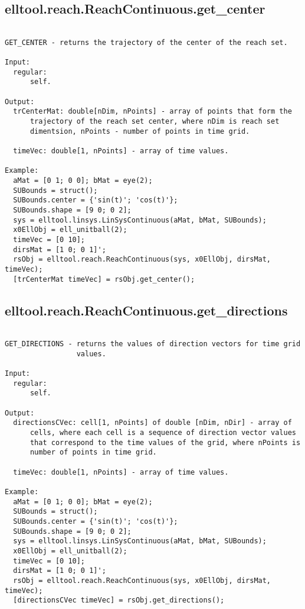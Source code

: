 \subsection{\texorpdfstring{elltool.reach.ReachContinuous.get\_center}{get\_center}}\label{method:elltool.reach.ReachContinuous.getcenter}
\begin{verbatim}

GET_CENTER - returns the trajectory of the center of the reach set.

Input:
  regular:
      self.

Output:
  trCenterMat: double[nDim, nPoints] - array of points that form the
      trajectory of the reach set center, where nDim is reach set
      dimentsion, nPoints - number of points in time grid.

  timeVec: double[1, nPoints] - array of time values.

Example:
  aMat = [0 1; 0 0]; bMat = eye(2);
  SUBounds = struct();
  SUBounds.center = {'sin(t)'; 'cos(t)'};
  SUBounds.shape = [9 0; 0 2];
  sys = elltool.linsys.LinSysContinuous(aMat, bMat, SUBounds);
  x0EllObj = ell_unitball(2);
  timeVec = [0 10];
  dirsMat = [1 0; 0 1]';
  rsObj = elltool.reach.ReachContinuous(sys, x0EllObj, dirsMat, timeVec);
  [trCenterMat timeVec] = rsObj.get_center();
\end{verbatim}
\subsection{\texorpdfstring{elltool.reach.ReachContinuous.get\_directions}{get\_directions}}\label{method:elltool.reach.ReachContinuous.getdirections}
\begin{verbatim}

GET_DIRECTIONS - returns the values of direction vectors for time grid
                 values.

Input:
  regular:
      self.

Output:
  directionsCVec: cell[1, nPoints] of double [nDim, nDir] - array of
      cells, where each cell is a sequence of direction vector values
      that correspond to the time values of the grid, where nPoints is
      number of points in time grid.

  timeVec: double[1, nPoints] - array of time values.

Example:
  aMat = [0 1; 0 0]; bMat = eye(2);
  SUBounds = struct();
  SUBounds.center = {'sin(t)'; 'cos(t)'};
  SUBounds.shape = [9 0; 0 2];
  sys = elltool.linsys.LinSysContinuous(aMat, bMat, SUBounds);
  x0EllObj = ell_unitball(2);
  timeVec = [0 10];
  dirsMat = [1 0; 0 1]';
  rsObj = elltool.reach.ReachContinuous(sys, x0EllObj, dirsMat, timeVec);
  [directionsCVec timeVec] = rsObj.get_directions();
\end{verbatim}
